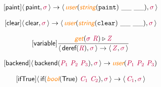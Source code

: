 \documentclass[10pt,leqno,fleqn]{article}
\newcommand{\artVariable}[1]{\mbox{\color{purple}\em #1\/}}
\newcommand{\artConstructor}[1]{\mbox{\sf #1}}
\newcommand{\artCaseInsensitiveLiteral}[1]{\mbox{\tt #1}}
\newcommand{\artSpecial}[1]{\mbox{\color{orange}\sf\em #1}}
\begin{document}
\begin{equation}
\tag*{[\artConstructor{\sf paint}]}
\begin{split}\langle\, \artConstructor{\sf paint}, \artVariable{$\sigma$}\,\rangle \rightarrow \langle\, \artSpecial{user}(\artSpecial{string}(\artCaseInsensitiveLiteral{paint})\ \_\_\ \_\_), \artVariable{$\sigma$}\,\rangle 
\end{split}
\end{equation}

\begin{equation}
\tag*{[\artConstructor{\sf clear}]}
\begin{split}\langle\, \artConstructor{\sf clear}, \artVariable{$\sigma$}\,\rangle \rightarrow \langle\, \artSpecial{user}(\artSpecial{string}(\artCaseInsensitiveLiteral{clear})\ \_\_\ \_\_), \artVariable{$\sigma$}\,\rangle 
\end{split}
\end{equation}

\begin{equation}
\tag*{[\artConstructor{\sf variable}]}
\begin{split}\frac{ \artSpecial{get}(\artVariable{$\sigma$}\ \artVariable{R})\triangleright \artVariable{Z} }{\langle\, \artConstructor{\sf deref}(\artVariable{R}), \artVariable{$\sigma$}\,\rangle \rightarrow \langle\, \artVariable{Z}, \artVariable{$\sigma$}\,\rangle }
\end{split}
\end{equation}

\begin{equation}
\tag*{[\artConstructor{\sf backend}]}
\begin{split}\langle\, \artConstructor{\sf backend}(\artVariable{P$_{1}$}\ \artVariable{P$_{2}$}\ \artVariable{P$_{3}$}), \artVariable{$\sigma$}\,\rangle \rightarrow \artSpecial{user}(\artVariable{P$_{1}$}\ \artVariable{P$_{2}$}\ \artVariable{P$_{3}$})
\end{split}
\end{equation}

\begin{equation}
\tag*{[\artConstructor{\sf ifTrue}]}
\begin{split}\langle\, \artConstructor{\sf if}(\artSpecial{bool}(\artConstructor{\sf True})\ \artVariable{C$_{1}$}\ \artVariable{C$_{2}$}), \artVariable{$\sigma$}\,\rangle \rightarrow \langle\, \artVariable{C$_{1}$}, \artVariable{$\sigma$}\,\rangle 
\end{split}
\end{equation}
\end{document}
